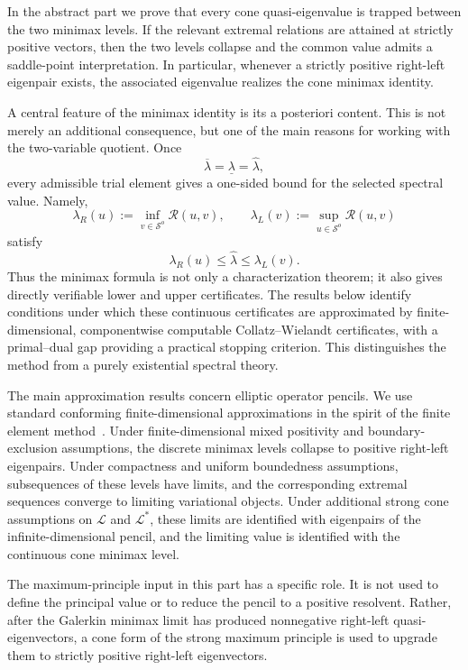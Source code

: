 \documentclass[preprint,10pt]{elsarticle}
\theoremstyle{plain}
\theoremstyle{definition}
\theoremstyle{remark}
\begin{document}
In the abstract part we prove that every cone quasi-eigenvalue is trapped
between the two minimax levels. If the relevant extremal relations are
attained at strictly positive vectors, then the two levels collapse and the
common value admits a saddle-point interpretation. In particular, whenever a
strictly positive right-left eigenpair exists, the associated eigenvalue
realizes the cone minimax identity.

A central feature of the minimax identity is its a posteriori content. This
is not merely an additional consequence, but one of the main reasons for
working with the two-variable quotient. Once
\[
\overline\lambda=\underline\lambda=\hat\lambda,
\]
every admissible trial element gives a one-sided bound for the selected
spectral value. Namely,
\[
\lambda_R(u)
:=
\inf_{v\in\mathcal S^o}\mathcal R(u,v),
\qquad
\lambda_L(v)
:=
\sup_{u\in\mathcal S^o}\mathcal R(u,v)
\]
satisfy
\[
\lambda_R(u)\le \hat\lambda\le \lambda_L(v).
\]
Thus the minimax formula is not only a characterization theorem; it also gives
directly verifiable lower and upper certificates. The results below identify
conditions under which these continuous certificates are approximated by
finite-dimensional, componentwise computable Collatz--Wielandt certificates,
with a primal--dual gap providing a practical stopping criterion. This
distinguishes the method from a purely existential spectral theory.

The main approximation results concern elliptic operator pencils. We use
standard conforming finite-dimensional approximations in the spirit of the
finite element method~\cite{ciaret,ciaretRav2,ciaretRav,Ern}. Under
finite-dimensional mixed positivity and boundary-exclusion assumptions, the
discrete minimax levels collapse to positive right-left eigenpairs. Under
compactness and uniform boundedness assumptions, subsequences of these levels
have limits, and the corresponding extremal sequences converge to limiting
variational objects. Under additional strong cone assumptions on
\(\mathcal L\) and \(\mathcal L^*\), these limits are identified with
eigenpairs of the infinite-dimensional pencil, and the limiting value is
identified with the continuous cone minimax level.

The maximum-principle input in this part has a specific role. It is not used
to define the principal value or to reduce the pencil to a positive resolvent.
Rather, after the Galerkin minimax limit has produced nonnegative right-left
quasi-eigenvectors, a cone form of the strong maximum principle is used to
upgrade them to strictly positive right-left eigenvectors.
\end{document}
